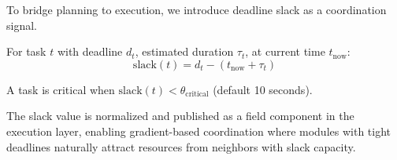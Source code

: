 To bridge planning to execution, we introduce deadline slack as a coordination signal.

\begin{definition}
For task $t$ with deadline $d_t$, estimated duration $\tau_t$, at current time $t_{\text{now}}$:
\begin{equation}
\text{slack}(t) = d_t - (t_{\text{now}} + \tau_t)
\end{equation}
\end{definition}

\begin{definition}
A task is critical when $\text{slack}(t) < \theta_{\text{critical}}$ (default 10 seconds).
\end{definition}

The slack value is normalized and published as a field component in the \ekkor{} execution layer, enabling gradient-based coordination where modules with tight deadlines naturally attract resources from neighbors with slack capacity.
